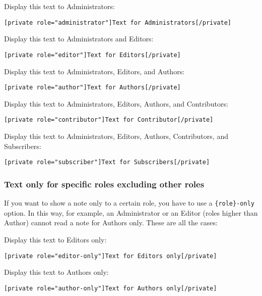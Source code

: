 \documentclass[a4paper,11pt]{article}
\begin{document}
Display this text to Administrators:

\begin{lstlisting}
[private role="administrator"]Text for Administrators[/private]
\end{lstlisting}

Display this text to Administrators and Editors:

\begin{lstlisting}
[private role="editor"]Text for Editors[/private]
\end{lstlisting}

Display this text to Administrators, Editors, and Authors:

\begin{lstlisting}
[private role="author"]Text for Authors[/private]
\end{lstlisting}

Display this text to Administrators, Editors, Authors, and Contributors:

\begin{lstlisting}
[private role="contributor"]Text for Contributor[/private]
\end{lstlisting}

Display this text to Administrators, Editors, Authors, Contributors, and Subscribers:

\begin{lstlisting}
[private role="subscriber"]Text for Subscribers[/private]
\end{lstlisting}

\subsubsection{Text only for specific roles excluding other roles}

If you want to show a note only to a certain role, you have to use a \verb+{role}-only+ option. In this way, for example, an Administrator or an Editor (roles higher than Author) cannot read a note for Authors only. These are all the cases: \newline

Display this text to Editors only:

\begin{lstlisting}
[private role="editor-only"]Text for Editors only[/private]
\end{lstlisting}

Display this text to Authors only:

\begin{lstlisting}
[private role="author-only"]Text for Authors only[/private]
\end{lstlisting}
\end{document}
